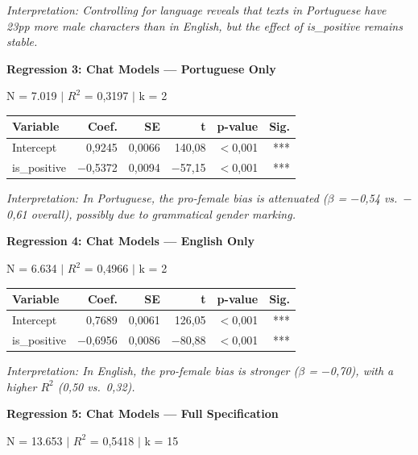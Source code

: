 \documentclass[jair,11pt,letterpaper]{article}
\begin{document}
\noindent\textit{Interpretation: Controlling for language reveals that texts in Portuguese have
23pp more male characters than in English, but the effect of
is\_positive remains stable.}

\vspace{0.5cm}
\noindent\textbf{Regression 3: Chat Models --- Portuguese Only}

\noindent N = 7.019 $|$ $R^2$ = 0,3197 $|$ k = 2

\begin{table}[H]
\centering
\begin{tabular}{lrrrrr}
\toprule
\textbf{Variable} & \textbf{Coef.} & \textbf{SE} & \textbf{t} & \textbf{p-value} & \textbf{Sig.} \\
\midrule
Intercept & 0,9245 & 0,0066 & 140,08 & $<$0,001 & *** \\
is\_positive & $-$0,5372 & 0,0094 & $-$57,15 & $<$0,001 & *** \\
\bottomrule
\end{tabular}
\end{table}

\noindent\textit{Interpretation: In Portuguese, the pro-female bias is attenuated ($\beta$ = $-$0,54
vs.\ $-$0,61 overall), possibly due to grammatical gender marking.}

\vspace{0.5cm}
\noindent\textbf{Regression 4: Chat Models --- English Only}

\noindent N = 6.634 $|$ $R^2$ = 0,4966 $|$ k = 2

\begin{table}[H]
\centering
\begin{tabular}{lrrrrr}
\toprule
\textbf{Variable} & \textbf{Coef.} & \textbf{SE} & \textbf{t} & \textbf{p-value} & \textbf{Sig.} \\
\midrule
Intercept & 0,7689 & 0,0061 & 126,05 & $<$0,001 & *** \\
is\_positive & $-$0,6956 & 0,0086 & $-$80,88 & $<$0,001 & *** \\
\bottomrule
\end{tabular}
\end{table}
\noindent\textit{Interpretation: In English, the pro-female bias is stronger ($\beta$ = $-$0,70),
with a higher $R^2$ (0,50 vs.\ 0,32).}

\vspace{0.5cm}
\noindent\textbf{Regression 5: Chat Models --- Full Specification}

\noindent N = 13.653 $|$ $R^2$ = 0,5418 $|$ k = 15
\end{document}
